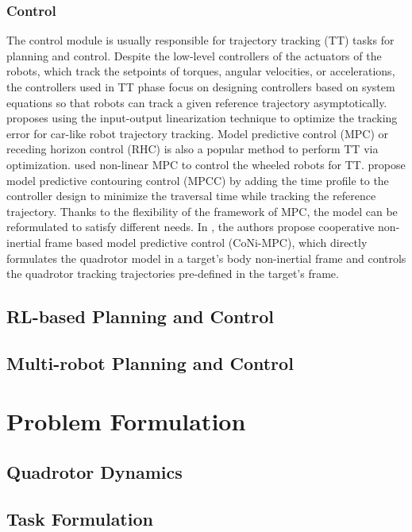 \documentclass[letterpaper,journal,twoside]{IEEEtran}
\begin{document}
\subsubsection{Control}
The control module is usually responsible for trajectory 
tracking (TT) tasks for planning and control.
Despite the low-level controllers of the actuators of the 
robots, which track the setpoints of torques, angular 
velocities, or accelerations, the controllers used in TT
phase focus on designing controllers based on system
equations so that robots can track a given reference 
trajectory asymptotically. 
\cite{majd2019stable} proposes using the input-output 
linearization technique to optimize the tracking error for
car-like robot trajectory tracking.
Model predictive control (MPC) or receding horizon control (RHC)
is also a popular method to perform TT via optimization.
\cite{kunhe2005mobile} used non-linear MPC to control the 
wheeled robots for TT.
\cite{romero2022model,ji2021cmpcc} propose model predictive
contouring control (MPCC) by adding the time profile to the 
controller design to minimize the traversal time while tracking
the reference trajectory.
Thanks to the flexibility of the framework of MPC, the model 
can be reformulated to satisfy different needs. 
In \cite{zhang2023coni}, the authors propose cooperative 
non-inertial frame based model predictive control (CoNi-MPC), 
which directly formulates the quadrotor model in a target's 
body non-inertial frame and controls the quadrotor tracking 
trajectories pre-defined in the target's frame.

\subsection{RL-based Planning and Control}

\subsection{Multi-robot Planning and Control}

\section{Problem Formulation}

\subsection{Quadrotor Dynamics}

\subsection{Task Formulation}



\end{document}
